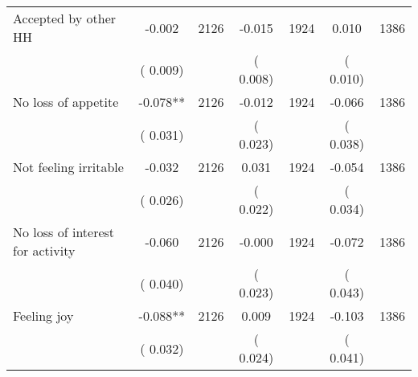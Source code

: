 \begin{tabular}{l*{6}{c}}
Accepted by other HH        &             -0.002      &       2126       &             -0.015      &       1924       &              0.010      &       1386       \\
                       &       (       0.009)            &                               &       (       0.008)            &                               &       (       0.010)            &                               \\
No loss of appetite        &             -0.078**      &       2126       &             -0.012      &       1924       &             -0.066      &       1386       \\
                       &       (       0.031)            &                               &       (       0.023)            &                               &       (       0.038)            &                               \\
Not feeling irritable        &             -0.032      &       2126       &              0.031      &       1924       &             -0.054      &       1386       \\
                       &       (       0.026)            &                               &       (       0.022)            &                               &       (       0.034)            &                               \\
No loss of interest for activity        &             -0.060      &       2126       &             -0.000      &       1924       &             -0.072      &       1386       \\
                       &       (       0.040)            &                               &       (       0.023)            &                               &       (       0.043)            &                               \\
Feeling joy        &             -0.088**      &       2126       &              0.009      &       1924       &             -0.103      &       1386       \\
                       &       (       0.032)            &                               &       (       0.024)            &                               &       (       0.041)            &                               \\
\hline \end{tabular}